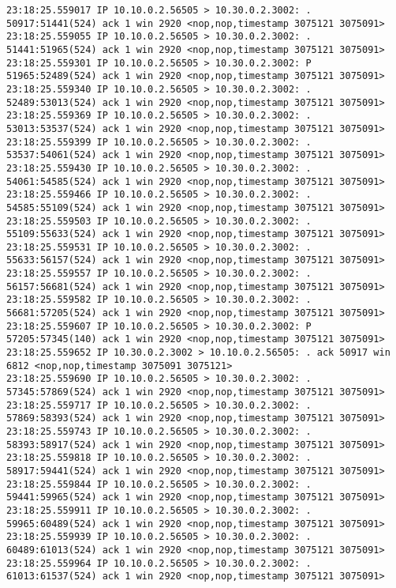 \documentclass[a4paper,12pt]{article}
\begin{document}
\begin{Verbatim}
23:18:25.559017 IP 10.10.0.2.56505 > 10.30.0.2.3002: . 50917:51441(524) ack 1 win 2920 <nop,nop,timestamp 3075121 3075091>
23:18:25.559055 IP 10.10.0.2.56505 > 10.30.0.2.3002: . 51441:51965(524) ack 1 win 2920 <nop,nop,timestamp 3075121 3075091>
23:18:25.559301 IP 10.10.0.2.56505 > 10.30.0.2.3002: P 51965:52489(524) ack 1 win 2920 <nop,nop,timestamp 3075121 3075091>
23:18:25.559340 IP 10.10.0.2.56505 > 10.30.0.2.3002: . 52489:53013(524) ack 1 win 2920 <nop,nop,timestamp 3075121 3075091>
23:18:25.559369 IP 10.10.0.2.56505 > 10.30.0.2.3002: . 53013:53537(524) ack 1 win 2920 <nop,nop,timestamp 3075121 3075091>
23:18:25.559399 IP 10.10.0.2.56505 > 10.30.0.2.3002: . 53537:54061(524) ack 1 win 2920 <nop,nop,timestamp 3075121 3075091>
23:18:25.559430 IP 10.10.0.2.56505 > 10.30.0.2.3002: . 54061:54585(524) ack 1 win 2920 <nop,nop,timestamp 3075121 3075091>
23:18:25.559466 IP 10.10.0.2.56505 > 10.30.0.2.3002: . 54585:55109(524) ack 1 win 2920 <nop,nop,timestamp 3075121 3075091>
23:18:25.559503 IP 10.10.0.2.56505 > 10.30.0.2.3002: . 55109:55633(524) ack 1 win 2920 <nop,nop,timestamp 3075121 3075091>
23:18:25.559531 IP 10.10.0.2.56505 > 10.30.0.2.3002: . 55633:56157(524) ack 1 win 2920 <nop,nop,timestamp 3075121 3075091>
23:18:25.559557 IP 10.10.0.2.56505 > 10.30.0.2.3002: . 56157:56681(524) ack 1 win 2920 <nop,nop,timestamp 3075121 3075091>
23:18:25.559582 IP 10.10.0.2.56505 > 10.30.0.2.3002: . 56681:57205(524) ack 1 win 2920 <nop,nop,timestamp 3075121 3075091>
23:18:25.559607 IP 10.10.0.2.56505 > 10.30.0.2.3002: P 57205:57345(140) ack 1 win 2920 <nop,nop,timestamp 3075121 3075091>
23:18:25.559652 IP 10.30.0.2.3002 > 10.10.0.2.56505: . ack 50917 win 6812 <nop,nop,timestamp 3075091 3075121>
23:18:25.559690 IP 10.10.0.2.56505 > 10.30.0.2.3002: . 57345:57869(524) ack 1 win 2920 <nop,nop,timestamp 3075121 3075091>
23:18:25.559717 IP 10.10.0.2.56505 > 10.30.0.2.3002: . 57869:58393(524) ack 1 win 2920 <nop,nop,timestamp 3075121 3075091>
23:18:25.559743 IP 10.10.0.2.56505 > 10.30.0.2.3002: . 58393:58917(524) ack 1 win 2920 <nop,nop,timestamp 3075121 3075091>
23:18:25.559818 IP 10.10.0.2.56505 > 10.30.0.2.3002: . 58917:59441(524) ack 1 win 2920 <nop,nop,timestamp 3075121 3075091>
23:18:25.559844 IP 10.10.0.2.56505 > 10.30.0.2.3002: . 59441:59965(524) ack 1 win 2920 <nop,nop,timestamp 3075121 3075091>
23:18:25.559911 IP 10.10.0.2.56505 > 10.30.0.2.3002: . 59965:60489(524) ack 1 win 2920 <nop,nop,timestamp 3075121 3075091>
23:18:25.559939 IP 10.10.0.2.56505 > 10.30.0.2.3002: . 60489:61013(524) ack 1 win 2920 <nop,nop,timestamp 3075121 3075091>
23:18:25.559964 IP 10.10.0.2.56505 > 10.30.0.2.3002: . 61013:61537(524) ack 1 win 2920 <nop,nop,timestamp 3075121 3075091>

\end{Verbatim}
\end{document}
